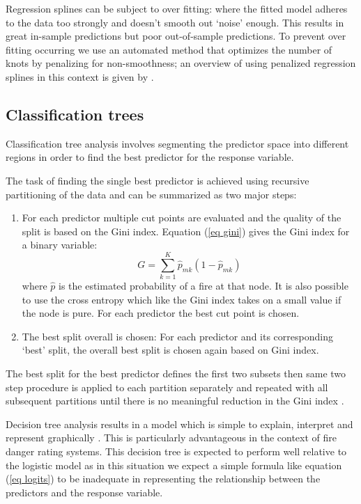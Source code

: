 \documentclass[11pt,a4paper]{article}
\begin{document}
Regression splines can be subject to over fitting: where the fitted model adheres to the data too strongly and doesn't smooth out `noise' enough. This results in great in-sample predictions but poor out-of-sample predictions. To prevent over fitting occurring we use an automated method that optimizes the number of knots by penalizing for non-smoothness; an overview of using penalized regression splines in this context is given by \citet{wood02}. 

\subsection{Classification trees}

Classification tree analysis involves segmenting the predictor space into different regions in order to find the best predictor for the response variable. 

The task of finding the single best predictor is achieved using recursive partitioning of the data and can be summarized as two major steps:
\begin{enumerate}
	\item For each predictor multiple cut points are evaluated and the quality of the split is based on the Gini index. Equation (\ref{eq gini}) gives the Gini index for a binary variable:
	\begin{equation}
	\label{eq gini}
	G=\sum_{k=1}^{K} \hat{p}_{mk} (1-\hat{p}_{mk})
	\end{equation}
	where $\hat{p}$ is the estimated probability of a fire at that node. It is also possible to use the cross entropy \citep{james13} which like the Gini index takes on a small value if the node is pure. 
	For each predictor the best cut point is chosen. 
	\item The best split overall is chosen:  For each predictor and its corresponding ‘best’ split, the overall best split is chosen again based on Gini index. 
\end{enumerate}

The best split for the best predictor defines the first two subsets then same two step procedure is applied to each partition separately and repeated with all subsequent partitions until there is no meaningful reduction in the Gini index \citep{berk08,james13}. 

Decision tree analysis results in a model which is simple to explain, interpret and represent graphically \citep{james13}. This is particularly advantageous in the context of fire danger rating systems.
This decision tree is expected to perform well relative to the logistic model as in this situation we expect a simple formula like equation (\ref{eq logits}) to be inadequate in representing the relationship between the predictors and the response variable.  
\end{document}
